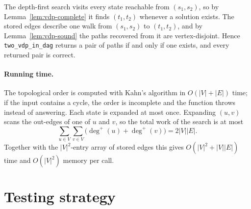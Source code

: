 The depth-first search visits every state reachable from $(s_1,s_2)$,
so by Lemma~\ref{lem:vdp-complete} it finds $(t_1,t_2)$ whenever a
solution exists. The stored edges describe one walk from $(s_1,s_2)$ to
$(t_1,t_2)$, and by Lemma~\ref{lem:vdp-sound} the paths recovered from
it are vertex-disjoint. Hence \texttt{two\_vdp\_in\_dag} returns a pair
of paths if and only if one exists, and every returned pair is correct.

\paragraph{Running time.} The topological order is computed with
Kahn's algorithm in $O(|V|+|E|)$ time; if the input contains a cycle,
the order is incomplete and the function throws instead of answering.
Each state is expanded at most once. Expanding $(u,v)$ scans the
out-edges of one of $u$ and $v$, so the total work of the search is at
most
\[
  \sum_{u\in V}\sum_{v\in V}\bigl(\deg^{+}(u)+\deg^{+}(v)\bigr)
  = 2|V||E|.
\]
Together with the $|V|^{2}$-entry array of stored edges this gives
$O(|V|^{2}+|V||E|)$ time and $O(|V|^{2})$ memory per call.

\section{Testing strategy}
\label{sec:correctness}

